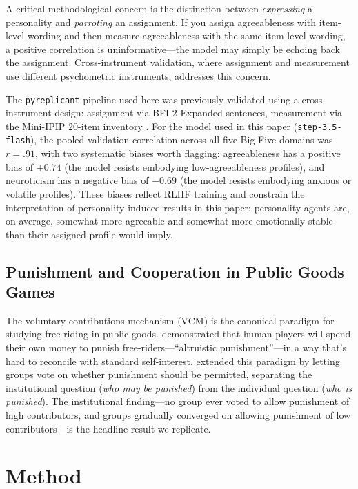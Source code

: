 \documentclass[12pt, a4paper]{article}
\begin{document}
A critical methodological concern is the distinction between \emph{expressing} a personality and \emph{parroting} an assignment. If you assign agreeableness with item-level wording and then measure agreeableness with the same item-level wording, a positive correlation is uninformative---the model may simply be echoing back the assignment. Cross-instrument validation, where assignment and measurement use different psychometric instruments, addresses this concern.

The \texttt{pyreplicant} pipeline used here was previously validated using a cross-instrument design: assignment via BFI-2-Expanded sentences, measurement via the Mini-IPIP $20$-item inventory \citep{donnellan2006mini}. For the model used in this paper (\texttt{step-3.5-flash}), the pooled validation correlation across all five Big Five domains was $r=.91$, with two systematic biases worth flagging: agreeableness has a positive bias of $+0.74$ (the model resists embodying low-agreeableness profiles), and neuroticism has a negative bias of $-0.69$ (the model resists embodying anxious or volatile profiles). These biases reflect RLHF training and constrain the interpretation of personality-induced results in this paper: personality agents are, on average, somewhat more agreeable and somewhat more emotionally stable than their assigned profile would imply.

\subsection{Punishment and Cooperation in Public Goods Games}

The voluntary contributions mechanism (VCM) is the canonical paradigm for studying free-riding in public goods. \citet{fehr2002altruistic} demonstrated that human players will spend their own money to punish free-riders---``altruistic punishment''---in a way that's hard to reconcile with standard self-interest. \citet{ertan2009who} extended this paradigm by letting groups vote on whether punishment should be permitted, separating the institutional question (\emph{who may be punished}) from the individual question (\emph{who is punished}). The institutional finding---no group ever voted to allow punishment of high contributors, and groups gradually converged on allowing punishment of low contributors---is the headline result we replicate.

\section{Method}
\end{document}
